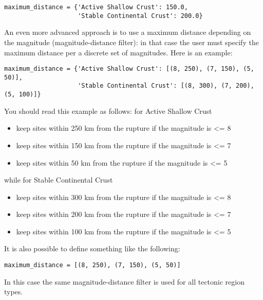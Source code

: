 \begin{verbatim}
maximum_distance = {'Active Shallow Crust': 150.0,
                    'Stable Continental Crust': 200.0}
\end{verbatim}

An even more advanced approach is to use a maximum distance depending on the
magnitude (magnitude-distance filter): in that case the user must specify
the maximum distance per a discrete set of magnitudes. Here is an
example:

\begin{verbatim}
maximum_distance = {'Active Shallow Crust': [(8, 250), (7, 150), (5, 50)],
                    'Stable Continental Crust': [(8, 300), (7, 200), (5, 100)]}
\end{verbatim}

You should read this example as follows: for Active Shallow Crust

\begin{itemize}
\item keep sites within 250 km from the rupture if the magnitude is <= 8
\item keep sites within 150 km from the rupture if the magnitude is <= 7
\item keep sites within 50 km from the rupture if the magnitude is <= 5
\end{itemize}

while for Stable Continental Crust

\begin{itemize}
\item keep sites within 300 km from the rupture if the magnitude is <= 8
\item keep sites within 200 km from the rupture if the magnitude is <= 7
\item keep sites within 100 km from the rupture if the magnitude is <= 5
\end{itemize}

It is also possible to define something like the following:

\begin{verbatim}
maximum_distance = [(8, 250), (7, 150), (5, 50)]
\end{verbatim}

In this case the same magnitude-distance filter is used for all tectonic
region types.

